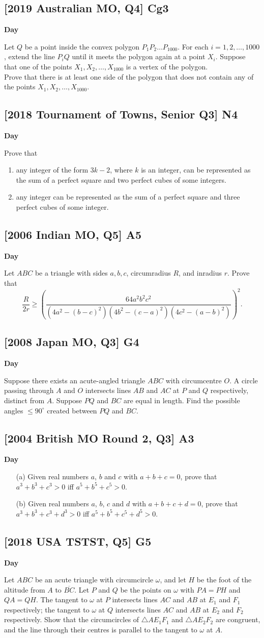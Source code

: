 \documentclass[10pt]{article}
\newcommand{\themonth}{March}
\newcommand{\theyear}{2019}
\newcounter{day}
\newcounter{solution}
\newcounter{datenumber}
\newcommand{\problem}[4][0]{
	\newpage
	\subsection{[#3] \space #2} \hfill 
	{\large\textbf{Day \arabic{day}}} %
	\begin{flushleft} #4 \end{flushleft}
	\vspace{1em}
	\addtocounter{day}{1}
	\addtocounter{datenumber}{1}
	\setcounter{solution}{1}
}
\begin{document}
\problem[103]{Cg3}{2019 Australian MO, Q4}{Let \(Q\) be a point inside the convex polygon \(P_1 P_2 \dots P_{1000}\). For each \(i=1, 2, \dots, 1000\), extend the line \(P_i Q\) until it meets the polygon again at a point \(X_i\). Suppose that one of the points \(X_1, X_2, \dots, X_{1000}\) is a vertex of the polygon.\\
\makebox[16pt]{}Prove that there is at least one side of the polygon that does not contain any of the points \(X_1, X_2, \dots, X_{1000}\).}

\problem[104]{N4}{2018 Tournament of Towns, Senior Q3}{Prove that\\
	\begin{enumerate}
		\item any integer of the form \(3k-2\), where \(k\) is an integer, can be represented as the sum of a perfect square and two perfect cubes of some integers.
		\item any integer can be represented as the sum of a perfect square and three perfect cubes of some integer.
	\end{enumerate}}

\problem[105]{A5}{2006 Indian MO, Q5}{Let \(ABC\) be a triangle with sides \(a, b, c\), circumradius \(R\), and inradius \(r\). Prove that
	\[\frac{R}{2r} \geq \left ( \frac{64a^2b^2c^2}{(4a^2-(b-c)^2)(4b^2-(c-a)^2)(4c^2-(a-b)^2)} \right )^2.\]}

\problem[106]{G4}{2008 Japan MO, Q3}{Suppose there exists an acute-angled triangle \(ABC\) with circumcentre \(O\). A circle passing through \(A\) and \(O\) intersects lines \(AB\) and \(AC\) at \(P\) and \(Q\) respectively, distinct from \(A\). Suppose \(PQ\) and \(BC\) are equal in length. Find the possible angles \(\leq 90^{\circ}\) created between \(PQ\) and \(BC\).}

\problem[107]{A3}{2004 British MO Round 2, Q3}{\begin{itemize}
		\item[(a)] Given real numbers $a$, $b$ and $c$ with $a+b+c=0$, prove that $a^3+b^3+c^3>0$ iff $a^5+b^5+c^5>0$. 
		\item[(b)] Given real numbers $a$, $b$, $c$ and $d$ with $a+b+c+d=0$, prove that $a^3+b^3+c^3+d^3>0$ iff $a^5+b^5+c^5+d^5>0$.
	\end{itemize}}

\problem[108]{G5}{2018 USA TSTST, Q5}{Let \(ABC\) be an acute triangle with circumcircle \(\omega\), and let \(H\) be the foot of the altitude from \(A\) to \(\overline{BC}\). Let \(P\) and \(Q\) be the points on \(\omega\) with \(PA = PH\) and \(QA = QH\). The tangent to \(\omega\) at \(P\) intersects lines \(AC\) and \(AB\) at \(E_1\) and \(F_1\) respectively; the tangent to \(\omega\) at \(Q\) intersects lines \(AC\) and \(AB\) at \(E_2\) and \(F_2\) respectively. Show that the circumcircles of \(\triangle AE_1F_1\) and \(\triangle AE_2F_2\) are congruent, and the line through their centres is parallel to the tangent to \(\omega\) at \(A\).}
\end{document}

